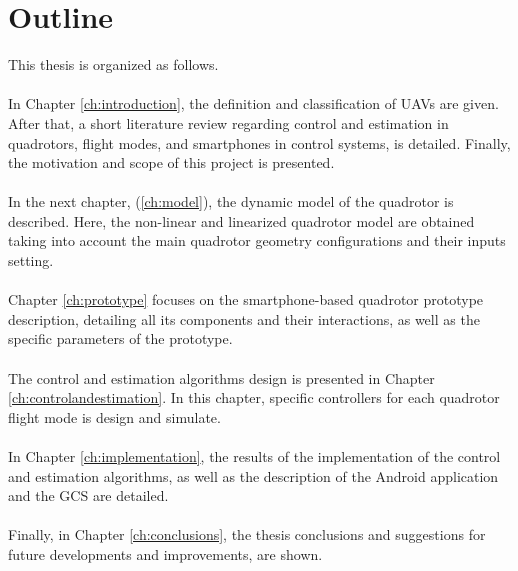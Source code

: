 \section{Outline}
This thesis is organized as follows.\\\\
In Chapter \ref{ch:introduction}, the definition and classification of UAVs are given. After that, a short literature review regarding control and estimation in quadrotors, flight modes, and smartphones in control systems, is detailed. Finally, the motivation and scope of this project is presented.
\\\\
In the next chapter, (\ref{ch:model}), the dynamic model of the quadrotor is described. Here, the non-linear and linearized quadrotor model are obtained taking into account the main quadrotor geometry configurations and their inputs setting. 
\\\\
Chapter \ref{ch:prototype} focuses on the smartphone-based quadrotor prototype description, detailing all its components and their interactions, as well as the specific parameters of the prototype.
\\\\
The control and estimation algorithms design is presented in Chapter \ref{ch:controlandestimation}. In this chapter, specific controllers for each quadrotor flight mode is design and simulate.
\\\\
In Chapter \ref{ch:implementation}, the results of the implementation of the control and estimation algorithms, as well as the description of the Android application and the GCS are detailed.
\\\\
Finally, in Chapter \ref{ch:conclusions}, the thesis conclusions and suggestions for future developments and improvements, are shown.